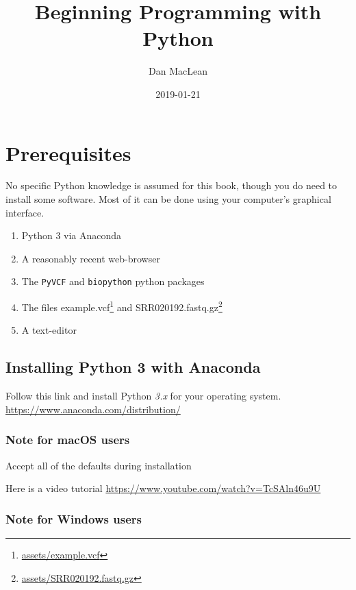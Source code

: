 \documentclass[]{book}
\title{Beginning Programming with Python}
\author{Dan MacLean}
\date{2019-01-21}
\providecommand{\tightlist}{%
  \setlength{\itemsep}{0pt}\setlength{\parskip}{0pt}}
\let\rmarkdownfootnote\footnote%
\def\footnote{\protect\rmarkdownfootnote}
\renewcommand{\href}[2]{#2\footnote{\url{#1}}}
\theoremstyle{definition}
\theoremstyle{definition}
\theoremstyle{definition}
\theoremstyle{remark}
\begin{document}
\maketitle

{
\setcounter{tocdepth}{1}
\tableofcontents
}
\hypertarget{prerequisites}{%
\chapter{Prerequisites}\label{prerequisites}}

No specific Python knowledge is assumed for this book, though you do
need to install some software. Most of it can be done using your
computer's graphical interface.

\begin{enumerate}
\def\labelenumi{\arabic{enumi}.}
\tightlist
\item
  Python 3 via Anaconda
\item
  A reasonably recent web-browser
\item
  The \texttt{PyVCF} and \texttt{biopython} python packages
\item
  The files \href{assets/example.vcf}{example.vcf} and
  \href{assets/SRR020192.fastq.gz}{SRR020192.fastq.gz}
\item
  A text-editor
\end{enumerate}

\hypertarget{installing-python-3-with-anaconda}{%
\section{Installing Python 3 with
Anaconda}\label{installing-python-3-with-anaconda}}

Follow this link and install Python \emph{3.x} for your operating
system. \url{https://www.anaconda.com/distribution/}

\hypertarget{note-for-macos-users}{%
\subsection{Note for macOS users}\label{note-for-macos-users}}

Accept all of the defaults during installation

Here is a video tutorial
\url{https://www.youtube.com/watch?v=TcSAln46u9U}

\hypertarget{note-for-windows-users}{%
\subsection{Note for Windows users}\label{note-for-windows-users}}
\end{document}

